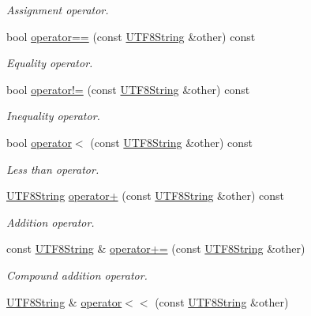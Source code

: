 \begin{DoxyCompactItemize}
\begin{DoxyCompactList}\small\item\em Assignment operator. \end{DoxyCompactList}\item 
bool \hyperlink{classchaos_1_1str_1_1_u_t_f8_string_ae4446150398d498e8aa9ebbc05ca7b52}{operator==} (const \hyperlink{classchaos_1_1str_1_1_u_t_f8_string}{U\+T\+F8\+String} \&other) const 
\begin{DoxyCompactList}\small\item\em Equality operator. \end{DoxyCompactList}\item 
bool \hyperlink{classchaos_1_1str_1_1_u_t_f8_string_a166394399a4d200494b40e034aa330da}{operator!=} (const \hyperlink{classchaos_1_1str_1_1_u_t_f8_string}{U\+T\+F8\+String} \&other) const 
\begin{DoxyCompactList}\small\item\em Inequality operator. \end{DoxyCompactList}\item 
bool \hyperlink{classchaos_1_1str_1_1_u_t_f8_string_ac7b54ed9c42a9c9a0a386d453d2c1daa}{operator$<$} (const \hyperlink{classchaos_1_1str_1_1_u_t_f8_string}{U\+T\+F8\+String} \&other) const 
\begin{DoxyCompactList}\small\item\em Less than operator. \end{DoxyCompactList}\item 
\hyperlink{classchaos_1_1str_1_1_u_t_f8_string}{U\+T\+F8\+String} \hyperlink{classchaos_1_1str_1_1_u_t_f8_string_a0d624a8e308b9a04511d31558ae37d8d}{operator+} (const \hyperlink{classchaos_1_1str_1_1_u_t_f8_string}{U\+T\+F8\+String} \&other) const 
\begin{DoxyCompactList}\small\item\em Addition operator. \end{DoxyCompactList}\item 
const \hyperlink{classchaos_1_1str_1_1_u_t_f8_string}{U\+T\+F8\+String} \& \hyperlink{classchaos_1_1str_1_1_u_t_f8_string_a9ce7f005abc581590ff3823db749873f}{operator+=} (const \hyperlink{classchaos_1_1str_1_1_u_t_f8_string}{U\+T\+F8\+String} \&other)
\begin{DoxyCompactList}\small\item\em Compound addition operator. \end{DoxyCompactList}\item 
\hyperlink{classchaos_1_1str_1_1_u_t_f8_string}{U\+T\+F8\+String} \& \hyperlink{classchaos_1_1str_1_1_u_t_f8_string_a3ab14e1ddffbadd664ebd4f228d11f17}{operator$<$$<$} (const \hyperlink{classchaos_1_1str_1_1_u_t_f8_string}{U\+T\+F8\+String} \&other)

\end{DoxyCompactItemize}
